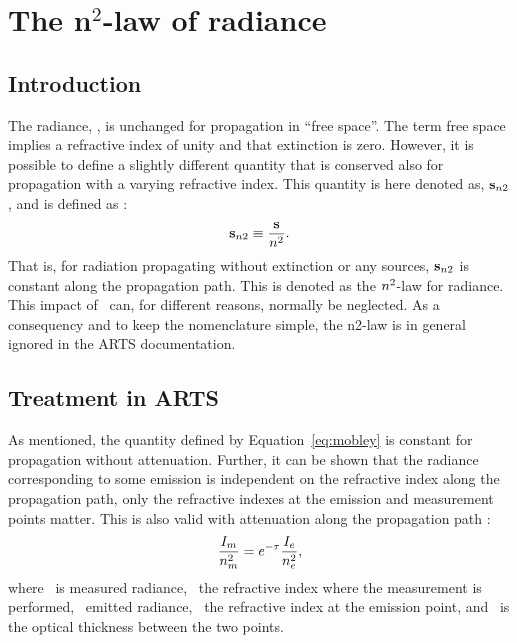 

\section{The n$^2$-law of radiance}
\label{sec:n2law}


\subsection{Introduction}

The radiance, \StoVec, is unchanged for propagation in ``free space''. The term
free space implies a refractive index of unity and that extinction is zero.
However, it is possible to define a slightly different quantity that is
conserved also for propagation with a varying refractive index. This quantity
is here denoted as, ${\bf s}_{n2}$, and is defined as
\citep{mobley:light:94,matlzer:radia:06}:
\begin{equation}
\label{eq:mobley}
{\bf s}_{n2}\equiv\frac{{\bf s}}{n^{2}}.
\end{equation}
That is, for radiation propagating without extinction or any sources,
${\bf s}_{n2}$ is constant along the propagation path. This is denoted as the
\(n^{2}\)-law for radiance. This impact of \Rfr\ can, for different reasons,
normally be neglected. As a consequency and to keep the nomenclature simple,
the n2-law is in general ignored in the ARTS documentation. 


\subsection{Treatment in ARTS}

As mentioned, the quantity defined by Equation~\ref{eq:mobley} is constant for
propagation without attenuation. Further, it can be shown that the radiance
corresponding to some emission is independent on the refractive index along the
propagation path, only the refractive indexes at the emission and measurement
points matter. This is also valid with attenuation along the propagation path
\citep[][Eq.~4.23]{mobley:light:94}:
\begin{equation}
  \label{eq:mobley423}
  \frac{I_{m}}{n_{m}^2} = e^{-\tau}\frac{I_{e}}{n_{e}^2},
\end{equation}
where \ is measured radiance, \ the refractive index where the
measurement is performed, \ emitted radiance, \ the refractive
index at the emission point, and \Oth\ is the optical thickness between the two
points. 


